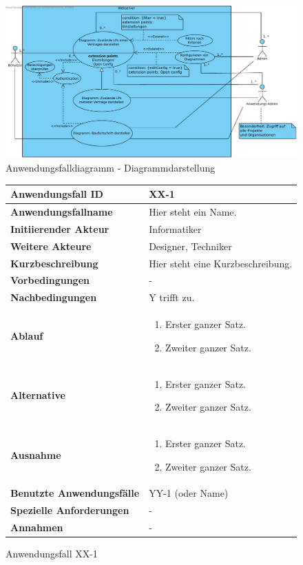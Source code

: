 \begin{figure}[h]
	\centering
	\includegraphics[width=\linewidth]{img/diagrams/Diagram_Display_Management_Web.pdf}
	\caption{Anwendungsfalldiagramm - Diagrammdarstellung}
	\label{fig:anwendungsfalldiagramm-dia-management}
\end{figure}

\newpage

\begin{figure}[h]
	\centering
	\begin{tabularx}{\textwidth}{ X | X }
		\textbf{Anwendungsfall ID} & XX-1 \\ \hline
		\textbf{Anwendungsfallname} & Hier steht ein Name. \\ \hline
		\textbf{Initiierender Akteur} & Informatiker \\ \hline
		\textbf{Weitere Akteure} & Designer, Techniker  \\ \hline
		\textbf{Kurzbeschreibung} & Hier steht eine Kurzbeschreibung.  \\ \hline
		\textbf{Vorbedingungen} & -  \\ \hline
		\textbf{Nachbedingungen} & Y trifft zu.  \\ \hline
		\textbf{Ablauf} &
		\begin{enumerate}
			\item Erster ganzer Satz.
			\item Zweiter ganzer Satz.
		\end{enumerate} \\ \hline
		\textbf{Alternative} &
		\begin{enumerate}
			\item Erster ganzer Satz.
			\item Zweiter ganzer Satz.
		\end{enumerate}  \\ \hline
		\textbf{Ausnahme} &
		\begin{enumerate}
			\item Erster ganzer Satz.
			\item Zweiter ganzer Satz.
		\end{enumerate}  \\ \hline
		\textbf{Benutzte Anwendungsfälle} & YY-1 (oder Name) \\ \hline
		\textbf{Spezielle Anforderungen} & - \\ \hline
		\textbf{Annahmen} & -
	\end{tabularx}
	\caption{Anwendungsfall XX-1}
	\label{fig:anwendungsfall-server-tabelle-xx-1}
\end{figure}